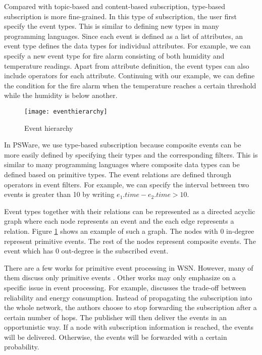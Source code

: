 Compared with topic-based and content-based subscription, type-based subscription is more fine-grained. In this type of subscription, the user first specify the event types. This is similar to defining new types in many programming languages. Since each event is defined as a list of attributes, an event type defines the data types for individual attributes. For example, we can specify a new event type for fire alarm consisting of both humidity and temperature readings. Apart from attribute definition, the event types can also include operators for each attribute. Continuing with our example, we can define the condition for the fire alarm when the temperature reaches a certain threshold while the humidity is below another. 

\begin{figure}
\centering
\texttt{[image: eventhierarchy]}
\caption{Event hierarchy}
\label{fig:eventhierarchy}
\end{figure}

In PSWare, we use type-based subscription because composite events can be more easily defined by specifying their types and the corresponding filters. This is similar to many programming languages where composite data types can be defined based on primitive types. The event relations are defined through operators in event filters. For example, we can specify the interval between two events is greater than 10 by writing \(e_1.time - e_2.time > 10\).

Event types together with their relations can be represented as a directed acyclic graph where each node represents an event and the each edge represents a relation. Figure \ref{fig:eventhierarchy} shows an example of such a graph. The nodes with 0 in-degree represent primitive events. The rest of the nodes represent composite events. The event which has 0 out-degree is the subscribed event.

There are a few works for primitive event processing in WSN. However, many of them discuss only primitive events \cite{lowlevelnaming} \cite{directeddiffusion} \cite{mires}. Other works may only emphasize on a specific issue in event processing. For example, \cite{sp} discusses the trade-off between reliability and energy consumption. Instead of propagating the subscription into the whole network, the authors choose to stop forwarding the subscription after a certain number of hops. The publisher will then deliver the events in an opportunistic way. If a node with subscription information is reached, the events will be delivered. Otherwise, the events will be forwarded with a certain probability.

